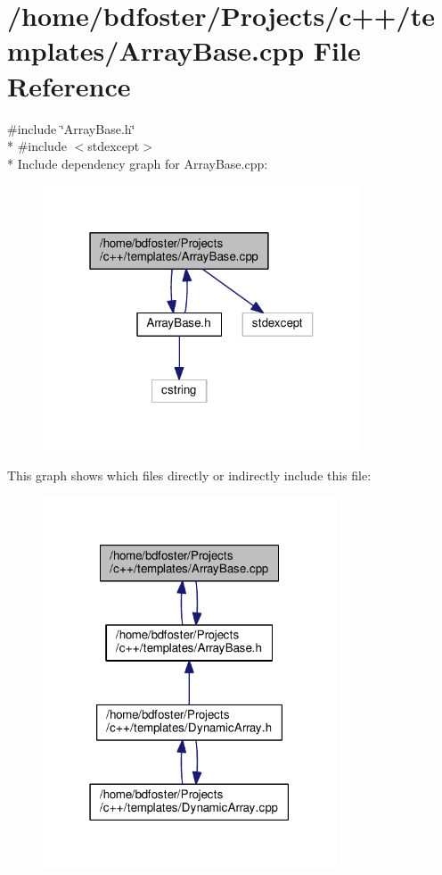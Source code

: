 \hypertarget{a00003}{\section{/home/bdfoster/\+Projects/c++/templates/\+Array\+Base.cpp File Reference}
\label{a00003}
}
{\ttfamily \#include \char`\"{}Array\+Base.\+h\char`\"{}}\\*
{\ttfamily \#include $<$stdexcept$>$}\\*
Include dependency graph for Array\+Base.\+cpp\+:
\nopagebreak
\begin{figure}[H]
\begin{center}
\leavevmode
\includegraphics[width=268pt]{de/d5e/a00007}
\end{center}
\end{figure}
This graph shows which files directly or indirectly include this file\+:
\nopagebreak
\begin{figure}[H]
\begin{center}
\leavevmode
\includegraphics[width=247pt]{d4/dee/a00008}
\end{center}
\end{figure}
